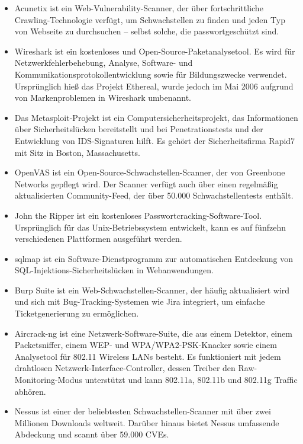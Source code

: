 \begin{itemize}
	\item Acunetix ist ein Web-Vulnerability-Scanner, der über fortschrittliche Crawling-Technologie verfügt, um Schwachstellen zu finden und jeden Typ von Webseite zu durchsuchen – selbst solche, die passwortgeschützt sind.
	\item Wireshark ist ein kostenloses und Open-Source-Paketanalysetool. Es wird für Netzwerkfehlerbehebung, Analyse, Software- und Kommunikationsprotokollentwicklung sowie für Bildungszwecke verwendet. Ursprünglich hieß das Projekt Ethereal, wurde jedoch im Mai 2006 aufgrund von Markenproblemen in Wireshark umbenannt.
	\item Das Metasploit-Projekt ist ein Computersicherheitsprojekt, das Informationen über Sicherheitslücken bereitstellt und bei Penetrationstests und der Entwicklung von IDS-Signaturen hilft. Es gehört der Sicherheitsfirma Rapid7 mit Sitz in Boston, Massachusetts.
	\item OpenVAS ist ein Open-Source-Schwachstellen-Scanner, der von Greenbone Networks gepflegt wird. Der Scanner verfügt auch über einen regelmäßig aktualisierten Community-Feed, der über 50.000 Schwachstellentests enthält.
	\item John the Ripper ist ein kostenloses Passwortcracking-Software-Tool. Ursprünglich für das Unix-Betriebssystem entwickelt, kann es auf fünfzehn verschiedenen Plattformen ausgeführt werden.
	\item sqlmap ist ein Software-Dienstprogramm zur automatischen Entdeckung von SQL-Injektions-Sicherheitslücken in Webanwendungen.
	\item Burp Suite ist ein Web-Schwachstellen-Scanner, der häufig aktualisiert wird und sich mit Bug-Tracking-Systemen wie Jira integriert, um einfache Ticketgenerierung zu ermöglichen.
	\item Aircrack-ng ist eine Netzwerk-Software-Suite, die aus einem Detektor, einem Packetsniffer, einem WEP- und WPA/WPA2-PSK-Knacker sowie einem Analysetool für 802.11 Wireless LANs besteht. Es funktioniert mit jedem drahtlosen Netzwerk-Interface-Controller, dessen Treiber den Raw-Monitoring-Modus unterstützt und kann 802.11a, 802.11b und 802.11g Traffic abhören.
	\item Nessus ist einer der beliebtesten Schwachstellen-Scanner mit über zwei Millionen Downloads weltweit. Darüber hinaus bietet Nessus umfassende Abdeckung und scannt über 59.000 CVEs.
\end{itemize}

